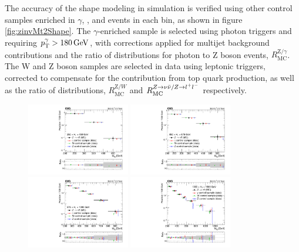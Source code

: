 The accuracy of the \mttwo shape modeling in simulation is verified using other control samples enriched in $\gamma$, \wlnu, and \zll events in each \HT bin, as shown in figure \ref{fig:zinvMt2Shape}. The $\gamma$-enriched sample is selected using photon triggers and requiring $p_{\mathrm{T}}^{\gamma} > 180\,\text{Ge\hspace{-.08em}V}$, with corrections applied for multijet background contributions and the ratio of \mttwo distributions for photon to Z boson events, $R_{\mathrm{MC}}^{\mathrm{Z}/\gamma}$. The W and Z boson samples are selected in data using leptonic triggers, corrected to compensate for the contribution from top quark production, as well as the ratio of \mttwo distributions, $R_{\mathrm{MC}}^{\mathrm{Z}/W}$ and $R_{\mathrm{MC}}^{Z\rightarrow\nu\bar{\nu}/Z\rightarrow l^+ l^-}$ respectively.
\begin{figure}
	\centering
	\includegraphics[width=0.4\textwidth]{backgrounds/figs/MT2VL_W_GJ_log}
	\includegraphics[width=0.4\textwidth]{backgrounds/figs/MT2L_W_GJ_log}
	\includegraphics[width=0.4\textwidth]{backgrounds/figs/MT2M_W_GJ_log}
	\includegraphics[width=0.4\textwidth]{backgrounds/figs/MT2H_W_GJ_log}

\end{figure}
